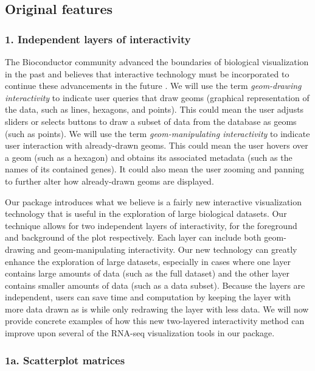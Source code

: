 \documentclass{bmcart}
\begin{document}
\subsection*{Original features}

\subsubsection*{1. Independent layers of interactivity}

The Bioconductor community advanced the boundaries of biological visualization in the past and believes that interactive technology must be incorporated to continue these advancements in the future \cite{gentleman2004bioconductor}. We will use the term \textit{geom-drawing interactivity} to indicate user queries that draw geoms (graphical representation of the data, such as lines, hexagons, and points). This could mean the user adjusts sliders or selects buttons to draw a subset of data from the database as geoms (such as points). We will use the term \textit{geom-manipulating interactivity} to indicate user interaction with already-drawn geoms. This could mean the user hovers over a geom (such as a hexagon) and obtains its associated metadata (such as the names of its contained genes). It could also mean the user zooming and panning to further alter how already-drawn geoms are displayed.

Our package introduces what we believe is a fairly new interactive visualization technology that is useful in the exploration of large biological datasets. Our technique allows for two independent layers of interactivity, for the foreground and background of the plot respectively. Each layer can include both geom-drawing and geom-manipulating interactivity. Our new technology can greatly enhance the exploration of large datasets, especially in cases where one layer contains large amounts of data (such as the full dataset) and the other layer contains smaller amounts of data (such as a data subset). Because the layers are independent, users can save time and computation by keeping the layer with more data drawn as is while only redrawing the layer with less data. We will now provide concrete examples of how this new two-layered interactivity method can improve upon several of the RNA-seq visualization tools in our package. 

\subsubsection*{1a. Scatterplot matrices}
\end{document}
